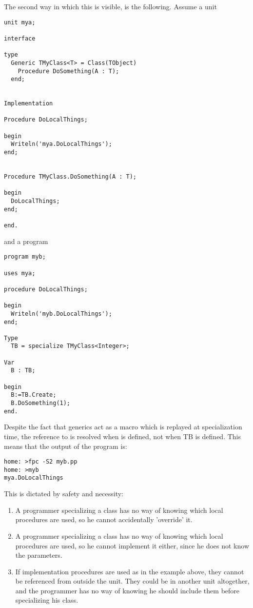 The second way in which this is visible, is the following. Assume a unit
\begin{verbatim}
unit mya;

interface

type
  Generic TMyClass<T> = Class(TObject)
    Procedure DoSomething(A : T);
  end;


Implementation

Procedure DoLocalThings;

begin
  Writeln('mya.DoLocalThings');
end;


Procedure TMyClass.DoSomething(A : T);

begin
  DoLocalThings;
end;

end.
\end{verbatim}
and a program 
\begin{verbatim}
program myb;

uses mya;

procedure DoLocalThings;

begin
  Writeln('myb.DoLocalThings');
end;

Type
  TB = specialize TMyClass<Integer>;

Var
  B : TB;

begin
  B:=TB.Create;
  B.DoSomething(1);
end.
\end{verbatim}
Despite the fact that generics act as a macro which is replayed at
specialization time, the reference to  is resolved
when  is defined, not when TB is defined. This means that the
output of the program is:
\begin{verbatim}
home: >fpc -S2 myb.pp
home: >myb
mya.DoLocalThings
\end{verbatim}
This is dictated by safety and necessity:
\begin{enumerate}
\item A programmer specializing a class has no way of knowing which local
procedures are used, so he cannot accidentally 'override' it.
\item A programmer specializing a class has no way of knowing which local
procedures are used, so he cannot implement it either, since he does not
know the parameters.
\item If implementation procedures are used as in the example above, they 
cannot be referenced from outside the unit. They could be in another unit
altogether, and the programmer has no way of knowing he should include them
before specializing his class.
\end{enumerate}

